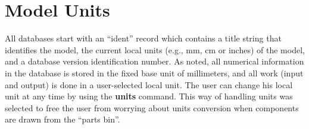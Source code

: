 \section{Model Units}

All databases start with an ``ident'' record which contains
a title string that identifies the model, the
current local units (e.g., mm, cm or inches) of the model,
and a database version identification number.
As noted, all numerical information
in the database is stored in the fixed base
unit of millimeters,
and all work (input and output) is done in a user-selected local unit.
The user can change his local unit at any time
by using the {\bf units} command.
This way of handling units was selected to free the user from worrying
about units conversion when components are drawn from the ``parts bin''.
